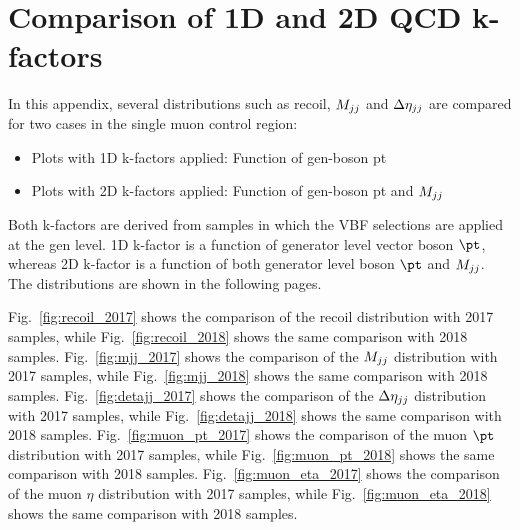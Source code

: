 \section{Comparison of 1D and 2D QCD k-factors}
\label{sec:1d_vs_2d_kfac}

In this appendix, several distributions such as recoil, $M_{jj}$ and $\Delta \eta_{jj}$ are compared for two cases in the single muon
control region:

\begin{itemize}
    \item Plots with 1D k-factors applied: Function of gen-boson pt
    \item Plots with 2D k-factors applied: Function of gen-boson pt and $M_{jj}$
\end{itemize}

Both k-factors are derived from samples in which the VBF selections are applied at the gen level. 1D k-factor is a function of
generator level vector boson $\pt$, whereas 2D k-factor is a function of both generator level boson $\pt$ and $M_{jj}$. 
The distributions are shown in the following pages. 

Fig.~\ref{fig:recoil_2017} shows the comparison of the recoil distribution 
with 2017 samples, while Fig.~\ref{fig:recoil_2018} shows the same comparison with 2018 samples. 
Fig.~\ref{fig:mjj_2017} shows the comparison of the $M_{jj}$ distribution 
with 2017 samples, while Fig.~\ref{fig:mjj_2018} shows the same comparison with 2018 samples. 
Fig.~\ref{fig:detajj_2017} shows the comparison of the $\Delta \eta_{jj}$ distribution 
with 2017 samples, while Fig.~\ref{fig:detajj_2018} shows the same comparison with 2018 samples. 
Fig.~\ref{fig:muon_pt_2017} shows the comparison of the muon $\pt$ distribution 
with 2017 samples, while Fig.~\ref{fig:muon_pt_2018} shows the same comparison with 2018 samples. 
Fig.~\ref{fig:muon_eta_2017} shows the comparison of the muon $\eta$ distribution 
with 2017 samples, while Fig.~\ref{fig:muon_eta_2018} shows the same comparison with 2018 samples. 

